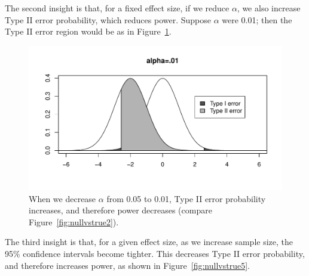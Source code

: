 \documentclass[12pt]{book}\usepackage[]{graphicx}\usepackage[]{color}
\makeatletter
\def\maxwidth{ %
  \ifdim\Gin@nat@width>\linewidth
    \linewidth
  \else
    \Gin@nat@width
  \fi
}
\newenvironment{knitrout}{}{} %
\makeatother
\begin{document}
The second insight is that, for a fixed effect size, if we reduce $\alpha$, we also increase Type II error probability, which reduces power. Suppose $\alpha$ were 0.01; then the Type II error region would be as in Figure~\ref{fig:nullvstrue4}.




\begin{figure}[!htbp]
\centering 
\begin{knitrout}
\color{fgcolor}
\includegraphics[width=\maxwidth]{figure/unnamed-chunk-64-1} 

\end{knitrout}
  \caption{When we decrease $\alpha$ from 0.05 to 0.01, Type II error probability increases, and therefore power decreases (compare Figure~\ref{fig:nullvstrue2}).}
  \label{fig:nullvstrue4}
\end{figure}

The third insight is that, for a given effect size, as we increase sample size, the 95\%
confidence intervals become tighter. This decreases Type II error
probability, and therefore increases power, as shown in Figure~\ref{fig:nullvstrue5}.
\end{document}
